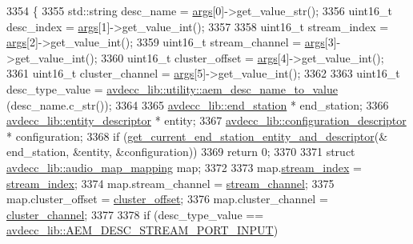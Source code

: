 \begin{DoxyCode}
3354 \{
3355     std::string desc\_name = \hyperlink{namespaceastime__fitline_a8187411843a6284ffb964ef3fb9fcab3}{args}[0]->get\_value\_str();
3356     uint16\_t desc\_index = \hyperlink{namespaceastime__fitline_a8187411843a6284ffb964ef3fb9fcab3}{args}[1]->get\_value\_int();
3357 
3358     uint16\_t stream\_index = \hyperlink{namespaceastime__fitline_a8187411843a6284ffb964ef3fb9fcab3}{args}[2]->get\_value\_int();
3359     uint16\_t stream\_channel = \hyperlink{namespaceastime__fitline_a8187411843a6284ffb964ef3fb9fcab3}{args}[3]->get\_value\_int();
3360     uint16\_t cluster\_offset = \hyperlink{namespaceastime__fitline_a8187411843a6284ffb964ef3fb9fcab3}{args}[4]->get\_value\_int();
3361     uint16\_t cluster\_channel = \hyperlink{namespaceastime__fitline_a8187411843a6284ffb964ef3fb9fcab3}{args}[5]->get\_value\_int();
3362 
3363     uint16\_t desc\_type\_value = \hyperlink{namespaceavdecc__lib_1_1utility_a9f6076e32fa227555a95b6e95ea1e29b}{avdecc\_lib::utility::aem\_desc\_name\_to\_value}
      (desc\_name.c\_str());
3364 
3365     \hyperlink{classavdecc__lib_1_1end__station}{avdecc\_lib::end\_station} * end\_station;
3366     \hyperlink{classavdecc__lib_1_1entity__descriptor}{avdecc\_lib::entity\_descriptor} * entity;
3367     \hyperlink{classavdecc__lib_1_1configuration__descriptor}{avdecc\_lib::configuration\_descriptor} * configuration;
3368     \textcolor{keywordflow}{if} (\hyperlink{classcmd__line_ac2d4611fba7db03d436a2e3c1e64828e}{get\_current\_end\_station\_entity\_and\_descriptor}(&
      end\_station, &entity, &configuration))
3369         \textcolor{keywordflow}{return} 0;
3370 
3371     \textcolor{keyword}{struct }\hyperlink{structavdecc__lib_1_1audio__map__mapping}{avdecc\_lib::audio\_map\_mapping} map;
3372 
3373     map.\hyperlink{structavdecc__lib_1_1audio__map__mapping_acad3919f1d34fc0ae26a5508175defb1}{stream\_index} = \hyperlink{structavdecc__lib_1_1audio__map__mapping_acad3919f1d34fc0ae26a5508175defb1}{stream\_index};
3374     map.stream\_channel = \hyperlink{structavdecc__lib_1_1audio__map__mapping_a99de82258f8163098a8ff558abf07af7}{stream\_channel};
3375     map.cluster\_offset = \hyperlink{structavdecc__lib_1_1audio__map__mapping_ad255a47e83b1a3056865a81c5f3a2545}{cluster\_offset};
3376     map.cluster\_channel = \hyperlink{structavdecc__lib_1_1audio__map__mapping_ad7ad28dde5b77668bff26372dab9ea76}{cluster\_channel};
3377 
3378     \textcolor{keywordflow}{if} (desc\_type\_value == \hyperlink{namespaceavdecc__lib_ac7b7d227e46bc72b63ee9e9aae15902fa54a680de439da84c5d5037a246d55b3f}{avdecc\_lib::AEM\_DESC\_STREAM\_PORT\_INPUT})

\end{DoxyCode}
